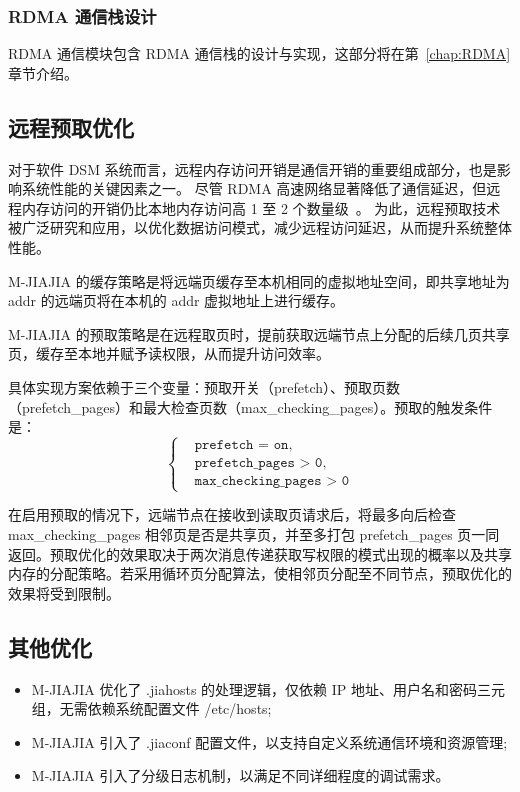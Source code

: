 {\begin{enumerate}[label=\arabic*.]
    \end{enumerate}

    \subsubsection{RDMA 通信栈设计}
    RDMA 通信模块包含 RDMA 通信栈的设计与实现，这部分将在第~\ref{chap:RDMA}章节介绍。

    \subsection{远程预取优化}
    对于软件 DSM 系统而言，远程内存访问开销是通信开销的重要组成部分，也是影响系统性能的关键因素之一。
    尽管 RDMA 高速网络显著降低了通信延迟，但远程内存访问的开销仍比本地内存访问高 1 至 2 个数量级~\citep{cai2018gam}。
    为此，远程预取技术被广泛研究和应用，以优化数据访问模式，减少远程访问延迟，从而提升系统整体性能。

    M-JIAJIA 的缓存策略是将远端页缓存至本机相同的虚拟地址空间，即共享地址为 addr 的远端页将在本机的 addr 虚拟地址上进行缓存。

    M-JIAJIA 的预取策略是在远程取页时，提前获取远端节点上分配的后续几页共享页，缓存至本地并赋予读权限，从而提升访问效率。

    具体实现方案依赖于三个变量：预取开关（prefetch）、预取页数（prefetch\_pages）和最大检查页数（max\_checking\_pages）。预取的触发条件是：
    $$
        \left\{
        \begin{aligned}
             & \texttt{prefetch = on},           \\
             & \texttt{prefetch\_pages > 0},     \\
             & \texttt{max\_checking\_pages > 0}
        \end{aligned}
        \right.
    $$

    在启用预取的情况下，远端节点在接收到读取页请求后，将最多向后检查 max\_checking\_pages 相邻页是否是共享页，并至多打包 prefetch\_pages 页一同返回。预取优化的效果取决于两次消息传递获取写权限的模式出现的概率以及共享内存的分配策略。若采用循环页分配算法，使相邻页分配至不同节点，预取优化的效果将受到限制。


    \subsection{其他优化}
    \begin{itemize}
        \item M-JIAJIA 优化了 .jiahosts 的处理逻辑，仅依赖 IP 地址、用户名和密码三元组，无需依赖系统配置文件 /etc/hosts;
        \item M-JIAJIA 引入了 .jiaconf 配置文件，以支持自定义系统通信环境和资源管理;
        \item M-JIAJIA 引入了分级日志机制，以满足不同详细程度的调试需求。
    \end{itemize}

}

